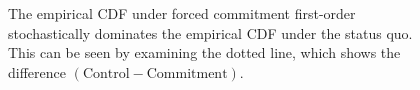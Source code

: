 \begin{figure}[H]
    The empirical CDF under forced commitment first-order stochastically dominates the empirical CDF under the status quo. This can be seen by examining the dotted line, which shows the difference $(\text{Control} - \text{Commitment})$. 
\end{figure}
   



